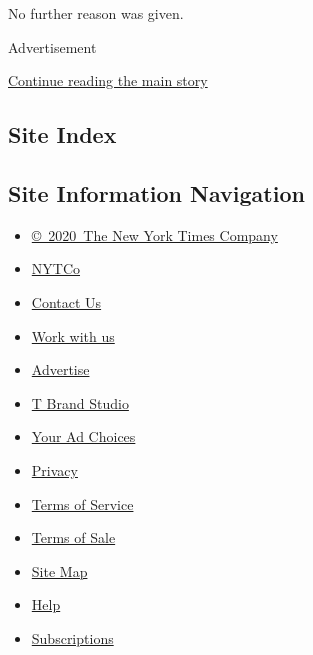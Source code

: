 No further reason was given.

Advertisement

\protect\hyperlink{after-bottom}{Continue reading the main story}

\hypertarget{site-index}{%
\subsection{Site Index}\label{site-index}}

\hypertarget{site-information-navigation}{%
\subsection{Site Information
Navigation}\label{site-information-navigation}}

\begin{itemize}
\tightlist
\item
  \href{https://help.nytimes.com/hc/en-us/articles/115014792127-Copyright-notice}{©~2020~The
  New York Times Company}
\end{itemize}

\begin{itemize}
\tightlist
\item
  \href{https://www.nytco.com/}{NYTCo}
\item
  \href{https://help.nytimes.com/hc/en-us/articles/115015385887-Contact-Us}{Contact
  Us}
\item
  \href{https://www.nytco.com/careers/}{Work with us}
\item
  \href{https://nytmediakit.com/}{Advertise}
\item
  \href{http://www.tbrandstudio.com/}{T Brand Studio}
\item
  \href{https://www.nytimes.com/privacy/cookie-policy\#how-do-i-manage-trackers}{Your
  Ad Choices}
\item
  \href{https://www.nytimes.com/privacy}{Privacy}
\item
  \href{https://help.nytimes.com/hc/en-us/articles/115014893428-Terms-of-service}{Terms
  of Service}
\item
  \href{https://help.nytimes.com/hc/en-us/articles/115014893968-Terms-of-sale}{Terms
  of Sale}
\item
  \href{https://spiderbites.nytimes.com}{Site Map}
\item
  \href{https://help.nytimes.com/hc/en-us}{Help}
\item
  \href{https://www.nytimes.com/subscription?campaignId=37WXW}{Subscriptions}
\end{itemize}
